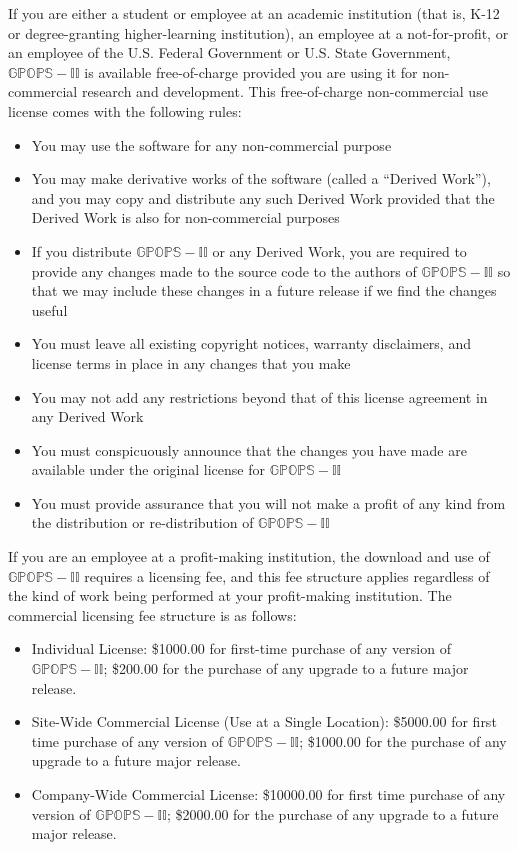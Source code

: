 \documentclass[10pt]{article}
\begin{document}
If you are either a student or employee at an academic institution
(that is, K-12 or degree-granting higher-learning institution), an
employee at a not-for-profit, or an employee of the U.S. Federal
Government or U.S. State Government, $\mathbb{GPOPS-II}$ is available
free-of-charge provided you are using it for non-commercial research
and development.  This free-of-charge non-commercial use license comes
with the following rules:
\begin{itemize}
\item You may use the software for any non-commercial purpose
\item You may make derivative works of the software (called a “Derived
  Work”), and you may copy and distribute any such Derived Work
  provided that the Derived Work is also for non-commercial purposes
\item If you distribute $\mathbb{GPOPS-II}$ or any Derived Work, you are required
  to provide any changes made to the source code to the authors of
  $\mathbb{GPOPS-II}$ so that we may include these changes in a future release if
  we find the changes useful
\item You must leave all existing copyright notices, warranty
  disclaimers, and license terms in place in any changes that you make
\item You may not add any restrictions beyond that of this license
  agreement in any Derived Work
\item You must conspicuously announce that the changes you have made
  are available under the original license for $\mathbb{GPOPS-II}$
\item You must provide assurance that you will not make a profit of
  any kind from the distribution or re-distribution of $\mathbb{GPOPS-II}$
\end{itemize}

If you are an employee at a profit-making institution, the download
and use of $\mathbb{GPOPS-II}$ requires a licensing fee, and this fee structure
applies regardless of the kind of work being performed at your
profit-making institution.  The commercial licensing fee structure is
as follows:   
\begin{itemize}
\item Individual License:  \$1000.00 for first-time purchase of any
  version of $\mathbb{GPOPS-II}$; \$200.00 for the purchase of any
  upgrade to a future major release. 
\item Site-Wide Commercial License (Use at a Single Location):
  \$5000.00 for first time purchase of any version of $\mathbb{GPOPS-II}$;
  \$1000.00 for the purchase of any upgrade to a future major release.
\item Company-Wide Commercial License:  \$10000.00 for first time
  purchase of any version of $\mathbb{GPOPS-II}$; \$2000.00 for the
  purchase of any upgrade to a future major release. 
\end{itemize}
\end{document}

